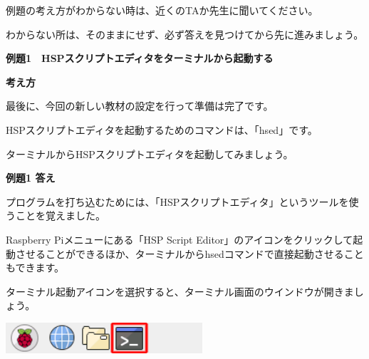 \documentclass[a4paper,dvipdfmx]{jarticle}
\newcommand\textstyleqwerty[1]{#1}
\begin{document}
\bigskip

例題の考え方がわからない時は、近くのTAか先生に聞いてください。

わからない所は、そのままにせず、必ず答えを見つけてから先に進みましょう。


\bigskip


\bigskip


\bigskip


\bigskip


\bigskip


\bigskip


\bigskip


\bigskip


\bigskip


\bigskip


\bigskip


\bigskip


\bigskip


\bigskip


\bigskip


\bigskip


\bigskip


\bigskip

\textstyleqwerty{\textbf{例題1　HSPスクリプトエディタをターミナルから起動する}}


\bigskip

{\bfseries
考え方}


\bigskip

最後に、今回の新しい教材の設定を行って準備は完了です。

HSPスクリプトエディタを起動するためのコマンドは、「hsed」です。

ターミナルからHSPスクリプトエディタを起動してみましょう。


\bigskip

{\bfseries
例題1 答え}


\bigskip

プログラムを打ち込むためには、「HSPスクリプトエディタ」というツールを使うことを覚えました。

Raspberry Piメニューにある「HSP Script
Editor」のアイコンをクリックして起動させることができるほか、ターミナルからhsedコマンドで直接起動させることもできます。


\bigskip

ターミナル起動アイコンを選択すると、ターミナル画面のウインドウが開きましょう。



\begin{center}
\includegraphics[width=7.303cm,height=1.15cm]{text02-img/text02-img003.png}

\end{center}
\end{document}
